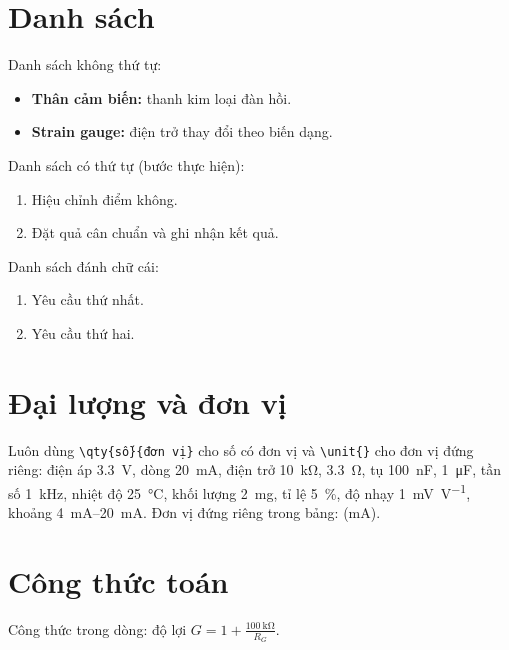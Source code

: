 \section{Danh sách}
\label{sec:cX:danh-sach}

Danh sách không thứ tự:
\begin{itemize}
    \item \textbf{Thân cảm biến:} thanh kim loại đàn hồi.
    \item \textbf{Strain gauge:} điện trở thay đổi theo biến dạng.
\end{itemize}

Danh sách có thứ tự (bước thực hiện):
\begin{enumerate}
    \item Hiệu chỉnh điểm không.
    \item Đặt quả cân chuẩn và ghi nhận kết quả.
\end{enumerate}

Danh sách đánh chữ cái:
\begin{enumerate}[label=\alph*.]
    \item Yêu cầu thứ nhất.
    \item Yêu cầu thứ hai.
\end{enumerate}

\section{Đại lượng và đơn vị}
\label{sec:cX:don-vi}

Luôn dùng \texttt{\textbackslash qty\{số\}\{đơn vị\}} cho số có đơn vị và \verb|\unit{}| cho đơn vị đứng riêng:
điện áp \qty{3.3}{\volt}, dòng \qty{20}{\milli\ampere}, điện trở \qty{10}{\kilo\ohm},
\qty{3.3}{\ohm}, tụ \qty{100}{\nano\farad}, \qty{1}{\micro\farad}, tần số \qty{1}{\kilo\hertz},
nhiệt độ \qty{25}{\celsius}, khối lượng \qty{2}{\milli\gram}, tỉ lệ \qty{5}{\percent},
độ nhạy \qty{1}{\milli\volt\per\volt}, khoảng \qtyrange{4}{20}{\milli\ampere}.
Đơn vị đứng riêng trong bảng: (\unit{\milli\ampere}).

\section{Công thức toán}
\label{sec:cX:cong-thuc}

Công thức trong dòng: độ lợi $G = 1 + \frac{\qty{100}{\kilo\ohm}}{R_G}$.

